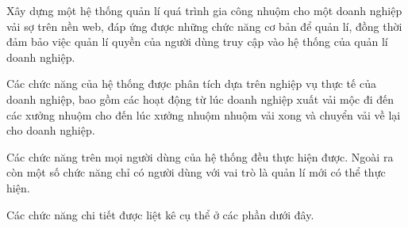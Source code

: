 Xây dựng một hệ thống quản lí quá trình gia công nhuộm cho một doanh nghiệp vải sợ trên nền web, đáp ứng được những chức năng cơ bản để quản lí, đồng thời đảm bảo việc quản lí quyền của người dùng truy cập vào hệ thống của quản lí doanh nghiệp. \par

Các chức năng của hệ thống được phân tích dựa trên nghiệp vụ thực tế của doanh nghiệp, bao gồm các hoạt động từ lúc doanh nghiệp xuất vải mộc đi đến các xưởng nhuộm cho đến lúc xưởng nhuộm nhuộm vải xong và chuyển vải về lại cho doanh nghiệp. \par

Các chức năng trên mọi người dùng của hệ thống đều thực hiện được. Ngoài ra còn một số chức năng chỉ có người dùng với vai trò là quản lí mới có thể thực hiện. \par

Các chức năng chi tiết được liệt kê cụ thể ở các phần dưới đây. \par

